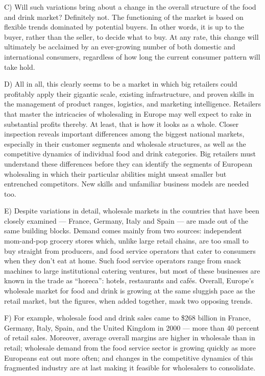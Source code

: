 \documentclass[UTF8,11pt]{ctexart}
\begin{document}
C) Will such variations bring about a change in the overall structure of the food and drink market? Definitely not. The functioning of the market is based on flexible trends dominated by potential buyers. In other words, it is up to the buyer, rather than the seller, to decide what to buy. At any rate, this change will ultimately be acclaimed by an ever-growing number of both domestic and international consumers, regardless of how long the current consumer pattern will take hold.


D) All in all, this clearly seems to be a market in which big retailers could profitably apply their gigantic scale, existing infrastructure, and proven skills in the management of product ranges, logistics, and marketing intelligence. Retailers that master the intricacies of wholesaling in Europe may well expect to rake in substantial profits thereby. At least, that is how it looks as a whole. Closer inspection reveals important differences among the biggest national markets, especially in their customer segments and wholesale structures, as well as the competitive dynamics of individual food and drink categories. Big retailers must understand these differences before they can identify the segments of European wholesaling in which their particular abilities might unseat smaller but entrenched competitors. New skills and unfamiliar business models are needed too.


E) Despite variations in detail, wholesale markets in the countries that have been closely examined — France, Germany, Italy and Spain — are made out of the same building blocks. Demand comes mainly from two sources: independent mom-and-pop grocery stores which, unlike large retail chains, are too small to buy straight from producers, and food service operators that cater to consumers when they don’t eat at home. Such food service operators range from snack machines to large institutional catering ventures, but most of these businesses are known in the trade as “horeca”: hotels, restaurants and cafés. Overall, Europe’s wholesale market for food and drink is growing at the same sluggish pace as the retail market, but the figures, when added together, mask two opposing trends.


F) For example, wholesale food and drink sales came to \$268 billion in France, Germany, Italy, Spain, and the United Kingdom in 2000 — more than 40 percent of retail sales. Moreover, average overall margins are higher in wholesale than in retail; wholesale demand from the food service sector is growing quickly as more Europeans eat out more often; and changes in the competitive dynamics of this fragmented industry are at last making it feasible for wholesalers to consolidate.
\end{document}
